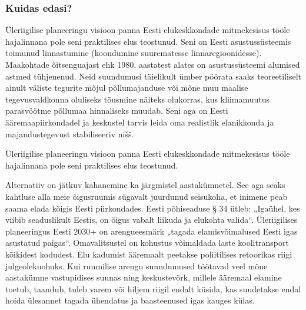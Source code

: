 \documentclass[estonian,]{article}
\begin{document}
\hypertarget{kuidas-edasi}{%
\subsubsection*{Kuidas edasi?}\label{kuidas-edasi}}

Üleriigilise planeeringu visioon panna Eesti elukeskkondade mitmekesisus tööle hajalinnana pole seni praktilises elus teostunud. Seni on Eesti asustussüsteemis toimunud linnastumine (koondumine suurematesse linnaregioonidesse). Maakohtade õitsenguajast ehk 1980. aastatest alates on asustussüsteemi alumised astmed tühjenenud. Neid suundumusi täielikult ümber pöörata saaks teoreetiliselt ainult väliste tegurite mõjul põllumajanduse või mõne muu maalise tegevusvaldkonna oluliseks tõusmine näiteks olukorras, kus kliimamuutus parasvöötme põllumaa hinnaliseks muudab. Seni aga on Eesti ääremaapiirkondadel ja keskustel tarvis leida oma realistlik elanikkonda ja majandustegevust stabiliseeriv nišš.

\begin{blockquote-right}
Üleriigilise planeeringu visioon panna Eesti elukeskkondade mitmekesisus
tööle hajalinnana pole seni praktilises elus teostunud.
\end{blockquote-right}

Alternatiiv on jätkuv kahanemine ka järgmistel aastakümnetel. See aga seaks kahtluse alla meie õigusruumis sügavalt juurdunud seisukoha, et inimene peab saama elada kõigis Eesti piirkondades. Eesti põhiseaduse § 34 ütleb: „Igaühel, kes viibib seaduslikult Eestis, on õigus vabalt liikuda ja elukohta valida``. Üleriigilises planeeringus Eesti 2030+ on arengueesmärk „tagada elamisvõimalused Eesti igas asustatud paigas``. Omavalitsustel on kohustus võimaldada laste koolitransport kõikidest kodudest. Elu kadumist ääremaalt peetakse poliitilises retoorikas riigi julgeolekuohuks. Kui ruumilise arengu suundumused töötavad veel mõne aastakümne vastupidises suunas ning keskustevõrk, millele ääremaal elamine toetub, taandub, tuleb varem või hiljem riigil endalt küsida, kas suudetakse endal hoida ülesannet tagada ühendatus ja baasteenused igas kauges külas.
\end{document}

